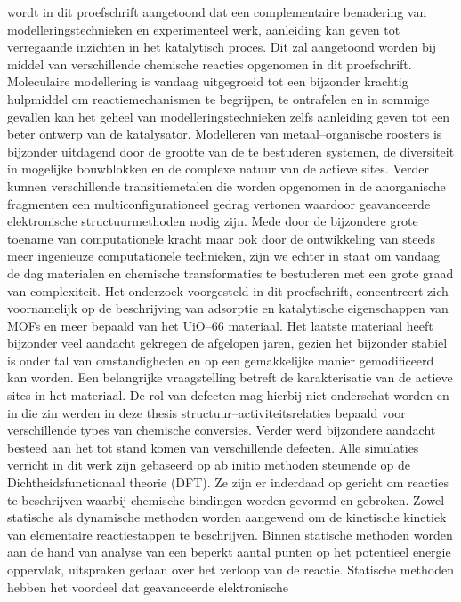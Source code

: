wordt in dit proefschrift aangetoond dat een complementaire benadering van modelleringstechnieken en experimenteel werk, 
aanleiding kan geven tot verregaande inzichten in het katalytisch proces. Dit zal aangetoond worden bij middel van verschillende chemische reacties opgenomen in dit proefschrift.
\npar
Moleculaire modellering is vandaag uitgegroeid tot een bijzonder krachtig hulpmiddel om reactiemechanismen te begrijpen, te ontrafelen en in 
sommige gevallen kan het geheel van modelleringstechnieken zelfs aanleiding geven tot een beter ontwerp van de katalysator. 
Modelleren van metaal--organische roosters is bijzonder uitdagend door de
grootte van de te bestuderen systemen, de diversiteit in mogelijke bouwblokken en de complexe natuur van de actieve sites. 
Verder kunnen verschillende transitiemetalen die worden opgenomen in de anorganische fragmenten een multiconfigurationeel gedrag vertonen waardoor 
geavanceerde elektronische structuurmethoden nodig zijn. Mede door de bijzondere
grote toename van computationele kracht maar ook door de ontwikkeling van steeds meer ingenieuze computationele technieken, zijn we echter in staat om vandaag de dag materialen en chemische transformaties te bestuderen 
met een grote graad van complexiteit.
\npar
Het onderzoek voorgesteld in dit proefschrift, concentreert zich voornamelijk op de beschrijving van adsorptie en katalytische eigenschappen van MOFs en meer 
bepaald van het UiO--66 materiaal. Het laatste materiaal heeft bijzonder veel
aandacht gekregen de afgelopen jaren, gezien het bijzonder stabiel is onder tal
van omstandigheden en op een gemakkelijke manier gemodificeerd kan worden.
Een belangrijke vraagstelling betreft de karakterisatie van de actieve sites in het materiaal. 
De rol van defecten mag hierbij niet onderschat worden en in die zin werden in
deze thesis structuur--activiteitsrelaties bepaald voor verschillende types van
chemische conversies. Verder werd bijzondere aandacht besteed aan het tot stand komen van verschillende defecten.
\npar
Alle simulaties verricht in dit werk zijn gebaseerd op ab initio methoden
steu\-nende op de Dichtheidsfunctionaal theorie (DFT).
Ze zijn er inderdaad op gericht om reacties te beschrijven waarbij chemische bindingen worden gevormd en gebroken. 
Zowel statische als dynamische methoden worden aangewend om de kinetische kinetiek van elementaire reactiestappen te beschrijven. 
Binnen stati\-sche methoden worden aan de hand van analyse van een beperkt
aantal punten op het potentieel energie oppervlak, uitspraken gedaan over het verloop van de reactie. Statische methoden hebben het voordeel dat geavanceerde elektronische 
